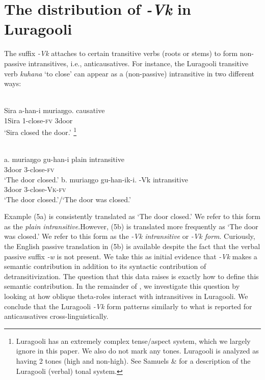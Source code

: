 \documentclass[output=paper]{langsci/langscibook}
\begin{document}
\section{The distribution of \textit{-Vk} in Luragooli}

The suffix \textit{-Vk} attaches to certain transitive verbs (roots or stems) to form non-passive intransitives, i.e., anticausatives. For instance, the Luragooli transitive verb \textit{kuhana} ‘to close’ can appear as a (non-passive) intransitive in two different ways:

\ea\label{exx:}
\ea
{}\\
\gll Sira    a-han-i      muriaŋgo.      causative\\
     1Sira 1-close-\textsc{fv}  3door\\
\glt ‘Sira closed the door.’
\footnote{ Luragooli has an extremely complex tense/aspect system, which we largely ignore in this paper. We also do not mark any tones. Luragooli is analyzed as having 2 tones (high and non-high). See Samuels \& \citet{Paster2015} for a description of the Luragooli (verbal) tonal system.}
\z
\z

\ea\label{exx:}
{}\\
\ea
\gll a. muriaŋgo gu-han-i        plain intransitive\\
       3door       3-close-\textsc{fv}\\
\glt ‘The door closed.’
\ex
\gll b. muriaŋgo gu-han-ik-i.      -\textup{Vk} intransitive\\
       3door         3-close-\textsc{Vk}-\textsc{fv}\\
\glt ‘The door closed.’/‘The door was closed.’
\z
\z

Example (5a) is consistently translated as ‘The door closed.’ We refer to this form as the \textit{plain intransitive}.However, (5b) is translated more frequently as ‘The door was closed.’ We refer to this form as the \textit{-Vk intransitive} or \textit{-Vk form}. Curiously, the English passive translation in (5b) is available despite the fact that the verbal passive suffix \textit{-w }is not present. We take this as initial evidence that \textit{-Vk} makes a semantic contribution in addition to its syntactic contribution of detransitivization. The question that this data raises is exactly how to define this semantic contribution.\textit{ }In the remainder of , we investigate this question by looking at how oblique theta-roles interact with intransitives in Luragooli. We conclude that the Luragooli \textit{-Vk} form patterns similarly to what is reported for anticausatives cross-linguistically.
\end{document}
